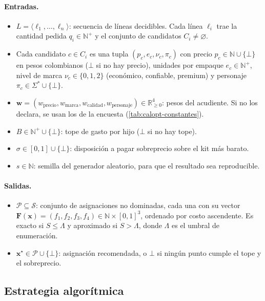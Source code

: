 \paragraph{Entradas.}
\begin{itemize}
  \item $L=\langle\ell_1,\dots,\ell_n\rangle$: secuencia de líneas decidibles.
  Cada línea $\ell_i$ trae la cantidad pedida $q_i\in\mathbb{N}^{+}$ y el
  conjunto de candidatos $C_i\neq\varnothing$.
  \item Cada candidato $c\in C_i$ es una tupla
  $(p_c,e_c,\nu_c,\pi_c)$ con precio $p_c\in\mathbb{N}\cup\{\bot\}$ en pesos
  colombianos ($\bot$ si no hay precio), unidades por empaque
  $e_c\in\mathbb{N}^{+}$, nivel de marca $\nu_c\in\{0,1,2\}$ (económico,
  confiable, premium) y personaje $\pi_c\in\Sigma^{*}\cup\{\bot\}$.
  \item $\mathbf{w}=(w_{\mathrm{precio}},w_{\mathrm{marca}},w_{\mathrm{calidad}},w_{\mathrm{personaje}})\in\mathbb{R}_{\geq0}^{4}$:
  pesos del acudiente. Si no los declara, se usan los de la encuesta
  (\cref{tab:calopt-constantes}).
  \item $B\in\mathbb{N}^{+}\cup\{\bot\}$: tope de gasto por hijo ($\bot$ si no
  hay tope).
  \item $\sigma\in[0,1]\cup\{\bot\}$: disposición a pagar sobreprecio sobre el
  kit más barato.
  \item $s\in\mathbb{N}$: semilla del generador aleatorio, para que el
  resultado sea reproducible.
\end{itemize}

\paragraph{Salidas.}
\begin{itemize}
  \item $\mathcal{P}\subseteq\mathcal{S}$: conjunto de asignaciones no dominadas,
  cada una con su vector
  $\mathbf{F}(\mathbf{x})=(f_1,f_2,f_3,f_4)\in\mathbb{N}\times[0,1]^3$, ordenado
  por costo ascendente. Es exacto si $S\leq\Lambda$ y aproximado si $S>\Lambda$,
  donde $\Lambda$ es el umbral de enumeración.
  \item $\mathbf{x}^{\star}\in\mathcal{P}\cup\{\bot\}$: asignación recomendada,
  o $\bot$ si ningún punto cumple el tope y el sobreprecio.
\end{itemize}

\subsection{Estrategia algorítmica}
\label{sec:calopt-estrategia}

